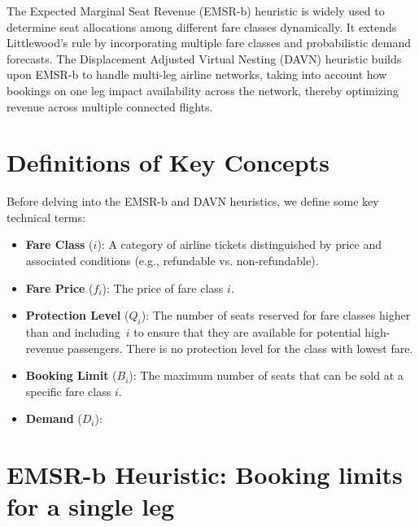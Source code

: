 \documentclass{article}
\begin{document}
The Expected Marginal Seat Revenue (EMSR-b) heuristic is widely used to 
determine seat allocations among different fare classes dynamically. It extends 
Littlewood’s rule by incorporating multiple fare classes and probabilistic 
demand forecasts. The Displacement Adjusted Virtual Nesting (DAVN) heuristic 
builds upon EMSR-b to handle multi-leg airline networks, taking into account how 
bookings on one leg impact availability across the network, thereby optimizing 
revenue across multiple connected flights.

\section{Definitions of Key Concepts}
Before delving into the EMSR-b and DAVN heuristics, we define some key technical 
terms:
\begin{itemize}
    \item \textbf{Fare Class} ($i$): A category of airline tickets distinguished 
by price and associated conditions (e.g., refundable vs. non-refundable).
    \item \textbf{Fare Price} ($f_i$): The price of fare class $i$.
    \item \textbf{Protection Level} ($Q_i$): The number of seats reserved for 
fare classes higher than and including~$i$ to ensure that they are available for 
potential high-revenue passengers. There is no protection level for the class 
with lowest fare.
    \item \textbf{Booking Limit} ($B_i$): The maximum number of seats that can 
be sold at a specific fare class $i$.
    \item \textbf{Demand} ($D_i$):
\end{itemize}

\section{EMSR-b Heuristic: Booking limits for a single leg}
\end{document}
